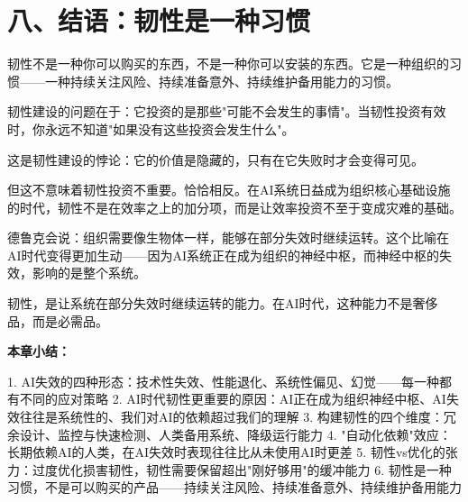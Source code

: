 \section{八、结语：韧性是一种习惯}


韧性不是一种你可以购买的东西，不是一种你可以安装的东西。它是一种组织的习惯——一种持续关注风险、持续准备意外、持续维护备用能力的习惯。

韧性建设的问题在于：它投资的是那些"可能不会发生的事情"。当韧性投资有效时，你永远不知道"如果没有这些投资会发生什么"。

这是韧性建设的悖论：它的价值是隐藏的，只有在它失败时才会变得可见。

但这不意味着韧性投资不重要。恰恰相反。在AI系统日益成为组织核心基础设施的时代，韧性不是在效率之上的加分项，而是让效率投资不至于变成灾难的基础。

德鲁克会说：组织需要像生物体一样，能够在部分失效时继续运转。这个比喻在AI时代变得更加生动——因为AI系统正在成为组织的神经中枢，而神经中枢的失效，影响的是整个系统。

韧性，是让系统在部分失效时继续运转的能力。在AI时代，这种能力不是奢侈品，而是必需品。


\textbf{本章小结：}

1. AI失效的四种形态：技术性失效、性能退化、系统性偏见、幻觉——每一种都有不同的应对策略
2. AI时代韧性更重要的原因：AI正在成为组织神经中枢、AI失效往往是系统性的、我们对AI的依赖超过我们的理解
3. 构建韧性的四个维度：冗余设计、监控与快速检测、人类备用系统、降级运行能力
4. "自动化依赖"效应：长期依赖AI的人类，在AI失效时表现往往比从未使用AI时更差
5. 韧性vs优化的张力：过度优化损害韧性，韧性需要保留超出"刚好够用"的缓冲能力
6. 韧性是一种习惯，不是可以购买的产品——持续关注风险、持续准备意外、持续维护备用能力
